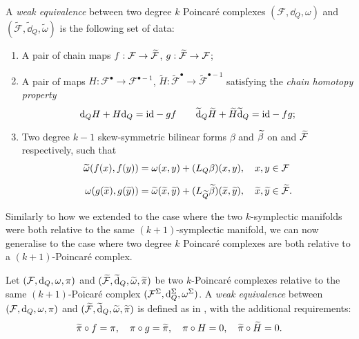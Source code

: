 \begin{definition}
\label{def:weak_eq_Poincaré}
    A \emph{weak equivalence} between two degree $k$ Poincaré complexes $(\mathcal{F}, \dd_Q, \omega)$ and $(\widetilde{\mathcal{F}}, \widetilde{\dd}_Q, \widetilde{\omega})$ is the following set of data:
    \begin{enumerate}[label=\roman*)]
        \item A pair of chain maps $f:\mathcal{F} \rightarrow \widetilde{\mathcal{F}}$, $g:\widetilde{\mathcal{F}} \rightarrow \mathcal{F}$;
        \item A pair of maps $H: \mathcal{F}^\bullet \rightarrow \mathcal{F}^{\bullet -1}$, $\widetilde{H}:\widetilde{\mathcal{F}}^\bullet \rightarrow \widetilde{\mathcal{F}}^{\bullet -1}$ satisfying the \emph{chain homotopy property}
        \begin{equation}
            \dd_Q H + H \dd_Q = \text{id} -gf \qquad \widetilde{\dd}_Q \widetilde{H} + \widetilde{H} \widetilde{\dd}_Q = \text{id} -fg ;
        \end{equation}
        \item Two degree $k-1$ skew-symmetric bilinear forms $\beta$ and $\widetilde{\beta}$ on \F and $\widetilde{\mathcal{F}}$ respectively, such that
        \begin{equation}
            \begin{aligned}
                \widetilde{\omega}(f(x), f(y)) =&
                \; \omega (x, y) +
                (L_Q \beta) (x, y),
                \quad x, y \in \mathcal{F} \\[6pt]
                \omega(g(\widetilde{x}), g(\widetilde{y})) =&
                \; \widetilde{\omega}(\widetilde{x}, \widetilde{y}) +
                (L_{\widetilde{Q}} \widetilde{\beta})(\widetilde{x}, \widetilde{y}),
                \quad \widetilde{x}, \widetilde{y} \in \widetilde{\mathcal{F}}.   
            \end{aligned}
        \end{equation}
    \end{enumerate}
\end{definition}

Similarly to how we extended  to the case where the two $k$-symplectic manifolds were both relative to the same $(k+1)$-symplectic manifold, we can now generalise  to the case where two degree $k$ Poincaré complexes are both relative to a $(k+1)$-Poincaré complex.

\begin{definition}
\label{def:weak_poincaré_relative}
    Let $(\mathcal{F}, \dd_Q, \omega, \pi)$ and $(\widetilde{\mathcal{F}}, \widetilde{\dd}_Q, \widetilde{\omega}, \widetilde{\pi})$ be two $k$-Poincaré complexes relative to the same $(k+1)$-Poicaré complex $(\mathcal{F}^\Sigma, \dd^\Sigma_Q, \omega^\Sigma)$.
    A \emph{weak equivalence} between $(\mathcal{F}, \dd_Q, \omega, \pi)$ and $(\widetilde{\mathcal{F}}, \widetilde{\dd}_Q, \widetilde{\omega}, \widetilde{\pi})$ is defined as in , with the additional requirements:
    \begin{equation*}
        \widetilde{\pi} \circ f = \pi, \quad
        \pi \circ g = \widetilde{\pi}, \quad
        \pi \circ H = 0, \quad
        \widetilde{\pi} \circ \widetilde{H} = 0 .
    \end{equation*}
\end{definition}
